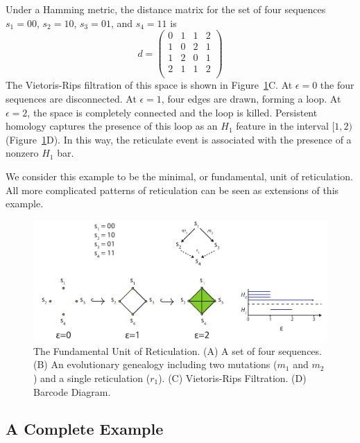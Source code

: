 Under a Hamming metric, the distance matrix for the set of four sequences $s_1=00$, $s_2=10$, $s_3=01$, and $s_4=11$ is
\begin{equation}
d = 
\begin{pmatrix}
0 & 1 & 1 & 2 \\
1 & 0 & 2 & 1 \\
1 & 2 & 0 & 1 \\
2 & 1 & 1 & 2 \\
\end{pmatrix}
\end{equation}
The Vietoris-Rips filtration of this space is shown in Figure~\ref{fig:bg:four_gamete_test}C.
At $\epsilon=0$ the four sequences are disconnected.
At $\epsilon=1$, four edges are drawn, forming a loop.
At $\epsilon=2$, the space is completely connected and the loop is killed.
Persistent homology captures the presence of this loop as an $H_1$ feature in the interval $[1,2)$ (Figure~\ref{fig:bg:four_gamete_test}D).
In this way, the reticulate event is associated with the presence of a nonzero $H_1$ bar.

We consider this example to be the minimal, or fundamental, unit of reticulation.
All more complicated patterns of reticulation can be seen as extensions of this example.

\begin{figure}
\centering
\includegraphics[width=\textwidth]{./fig/background/four_gamete_test.pdf}
\caption[Fundamental Unit of Reticulation]{The Fundamental Unit of Reticulation. (A) A set of four sequences. (B) An evolutionary genealogy including two mutations ($m_1$ and $m_2$) and a single reticulation ($r_1$). (C) Vietoris-Rips Filtration. (D) Barcode Diagram.}
\label{fig:bg:four_gamete_test}
\end{figure}

\subsection{A Complete Example}
\label{bg:top4bio:full_example}

